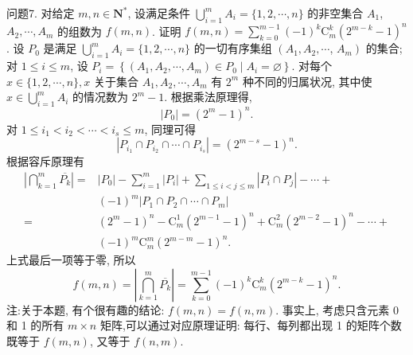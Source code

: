 问题7. 对给定 $m, n \in \mathbf{N}^*$, 设满足条件 $\bigcup_{i=1}^m A_i=\{1,2, \cdots, n\}$ 的非空集合 $A_1$, $A_2, \cdots, A_m$ 的组数为 $f(m, n)$. 证明 $f(m, n)=\sum_{k=0}^{m-1}(-1)^k \mathrm{C}_m^k\left(2^{m-k}-1\right)^n$. 
设 $P_0$ 是满足 $\bigcup_{i=1}^m A_i=\{1,2, \cdots, n\}$ 的一切有序集组 $\left(A_1, A_2, \cdots\right.$, $\left.A_m\right)$ 的集合; 对 $1 \leqslant i \leqslant m$, 设 $P_i=\left\{\left(A_1, A_2, \cdots, A_m\right) \in P_0 \mid A_i=\varnothing\right\}$.
对每个 $x \in\{1,2, \cdots, n\}, x$ 关于集合 $A_1, A_2, \cdots, A_m$ 有 $2^m$ 种不同的归属状况, 其中使 $x \in \bigcup_{i=1}^m A_i$ 的情况数为 $2^m-1$. 根据乘法原理得,
$$
\left|P_0\right|=\left(2^m-1\right)^n .
$$
对 $1 \leqslant i_1<i_2<\cdots<i_s \leqslant m$, 同理可得
$$
\left|P_{i_1} \cap P_{i_2} \cap \cdots \cap P_{i_s}\right|=\left(2^{m-s}-1\right)^n .
$$
根据容斥原理有
$$
\begin{aligned}
\left|\bigcap_{k=1}^m \overline{P_k}\right|= & \left|P_0\right|-\sum_{i=1}^m\left|P_i\right|+\sum_{1 \leqslant i<j \leqslant m}\left|P_i \cap P_j\right|-\cdots+ \\
& (-1)^m\left|P_1 \cap P_2 \cap \cdots \cap P_m\right| \\
= & \left(2^m-1\right)^n-\mathrm{C}_m^1\left(2^{m-1}-1\right)^n+\mathrm{C}_m^2\left(2^{m-2}-1\right)^n-\cdots+ \\
& (-1)^m \mathrm{C}_m^m\left(2^{m-m}-1\right)^n .
\end{aligned}
$$
上式最后一项等于零, 所以
$$
f(m, n)=\left|\bigcap_{k=1}^m \overline{P_k}\right|=\sum_{k=0}^{m-1}(-1)^k \mathrm{C}_m^k\left(2^{m-k}-1\right)^n .
$$
注:关于本题, 有个很有趣的结论: $f(m, n)=f(n, m)$. 事实上, 考虑只含元素 0 和 1 的所有 $m \times n$ 矩阵,可以通过对应原理证明: 每行、每列都出现 1 的矩阵个数既等于 $f(m, n)$, 又等于 $f(n, m)$.




